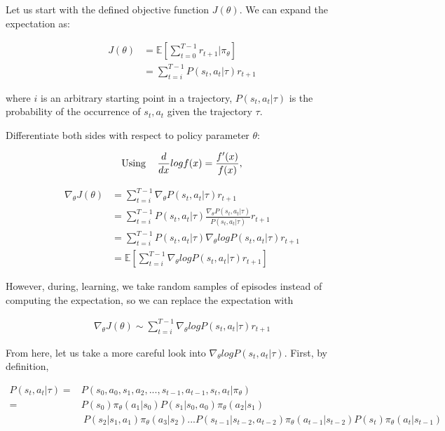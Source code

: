 \documentclass[letterpaper,11pt]{article}
\begin{document}
Let us start with the defined objective function $J(\theta)$. We can expand the expectation as:

$$
\begin{aligned}
J(\theta) &= \mathbb{E}[\sum\limits_{t=0}^{T-1} r_{t+1} | \pi_{\theta}] \\ &= \sum\limits_{t=i}^{T-1}P(s_{t}, a_{t} | \tau) r_{t+1}
\end{aligned}
$$

\noindent where $i$ is an arbitrary starting point in a trajectory, $P(s_{t}, a_{t} | \tau)$ is the probability of the occurrence of $s_{t}, a_{t}$ given the
trajectory $\tau$.
\vspace{0.5cm}

\noindent Differentiate both sides with respect to policy parameter $\theta$:

$$
\text{Using  \hspace{0.3cm}}
\begin{aligned}
    \frac{d}{dx} log f(x) = \frac{f'(x)}{f(x)},
\end{aligned}
$$

$$
\begin{aligned}
    \nabla_{\theta} J(\theta) & = \sum\limits_{t=i}^{T-1} \nabla_{\theta} P(s_{t}, a_{t} | \tau) r_{t+1} \\ 
    & = \sum\limits_{t=i}^{T-1} P(s_{t}, a_{t} | \tau) \frac{\nabla_{\theta} P(s_{t}, a_{t} | \tau)}{P(s_{t}, a_{t} | \tau)} r_{t+1} \\ 
    & = \sum\limits_{t=i}^{T-1} P(s_{t}, a_{t} | \tau) \nabla_{\theta} log P(s_{t}, a_{t} | \tau) r_{t+1} \\ 
    & = \mathbb{E} [\sum\limits_{t=i}^{T-1} \nabla_{\theta} log P(s_{t}, a_{t} | \tau) r_{t+1}]
\end{aligned}
$$

\noindent However, during, learning, we take random samples of episodes instead of computing the expectation, so we can replace the expectation with 

$$
\begin{aligned}
    \nabla_{\theta} J(\theta) \sim \sum\limits_{t=i}^{T-1} \nabla_{\theta} log P(s_{t}, a_{t} | \tau) r_{t+1}
\end{aligned}
$$

From here, let us take a more careful look into $\nabla_{\theta} log P(s_{t}, a_{t} | \tau) $. First, by definition,

$$
\begin{aligned}
    P(s_{t}, a_{t} | \tau) ={}& P(s_{0}, a_{0}, s_{1}, a_{2}, ..., s_{t-1}, a_{t-1}, s_{t}, a_{t} | \pi_{\theta}) \\
                           ={}& P(s_{0}) \pi_{\theta}(a_{1} | s_{0}) P(s_{1} | s_{0}, a_{0}) \pi_{\theta}(a_{2} | s_{1}) \\
& \ P(s_{2} | s_{1}, a_{1}) \pi_{\theta}(a_{3} | s_{2}) ... P(s_{t-1} | s_{t-2}, a_{t-2}) \pi_{\theta}(a_{t-1} | s_{t-2}) P(s_{t}) \pi_{\theta}(a_{t} | s_{t-1})
\end{aligned}
$$
\end{document}
